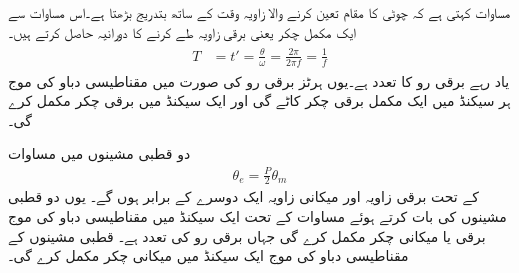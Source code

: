 مساوات   کہتی ہے  کہ چوٹی کا مقام تعین کرنے والا زاویہ وقت کے ساتھ  بتدریج بڑھتا  ہے۔اس مساوات سے  ایک مکمل چکر یعنی   برقی زاویہ طے کرنے   کا دورانیہ  حاصل کرتے ہیں۔
\begin{gather}
\begin{aligned}\label{مساوات_گھومتے_مشین_دوری_وقفہ}
T&=t'=\frac{\theta}{\omega}=\frac{2\pi}{2\pi f}=\frac{1}{f}
\end{aligned}
\end{gather}
یاد رہے  برقی رو کا تعدد ہے۔یوں  ہرٹز برقی رو کی صورت میں مقناطیسی دباو کی موج ہر  سیکنڈ میں ایک مکمل برقی چکر کاٹے گی اور ایک سیکنڈ میں  برقی چکر مکمل کرے گی۔

دو قطبی مشینوں میں مساوات 
\begin{align}\label{مساوات_بنیادی_اصول_زاویات_برقی_میکانی}
\theta_e=\frac{P}{2} \theta_m
\end{align}
 کے تحت  برقی زاویہ   اور میکانی زاویہ  ایک دوسرے کے برابر ہوں گے۔ یوں دو قطبی مشینوں کی بات کرتے ہوئے  مساوات   کے تحت ایک سیکنڈ میں مقناطیسی دباو کی موج  برقی یا میکانی چکر مکمل کرے  گی جہاں  برقی رو کی تعدد ہے۔   قطبی مشینوں  کے مقناطیسی دباو کی موج ایک سیکنڈ میں  میکانی چکر مکمل کرے گی۔

